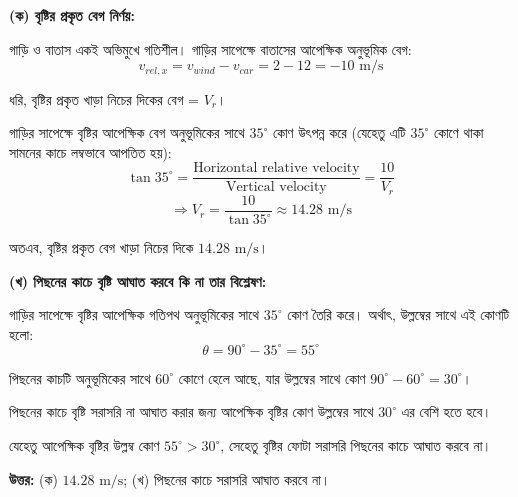 \documentclass[11pt,a4paper]{article}
\begin{document}
\begin{solbox}
\begin{center}
\end{center}

\textbf{(ক) বৃষ্টির প্রকৃত বেগ নির্ণয়:}

গাড়ি ও বাতাস একই অভিমুখে গতিশীল। গাড়ির সাপেক্ষে বাতাসের আপেক্ষিক অনুভূমিক বেগ:
$$v_{rel, x} = v_{wind} - v_{car} = 2 - 12 = -10\text{ m/s}$$

ধরি, বৃষ্টির প্রকৃত খাড়া নিচের দিকের বেগ = $V_r$।

গাড়ির সাপেক্ষে বৃষ্টির আপেক্ষিক বেগ অনুভূমিকের সাথে $35^\circ$ কোণ উৎপন্ন করে (যেহেতু এটি $35^\circ$ কোণে থাকা সামনের কাচে লম্বভাবে আপতিত হয়):
$$\tan 35^\circ = \frac{\text{Horizontal relative velocity}}{\text{Vertical velocity}} = \frac{10}{V_r}$$
$$\Rightarrow V_r = \frac{10}{\tan 35^\circ} \approx 14.28\text{ m/s}$$

অতএব, বৃষ্টির প্রকৃত বেগ খাড়া নিচের দিকে $14.28\text{ m/s}$।

\textbf{(খ) পিছনের কাচে বৃষ্টি আঘাত করবে কি না তার বিশ্লেষণ:}

গাড়ির সাপেক্ষে বৃষ্টির আপেক্ষিক গতিপথ অনুভূমিকের সাথে $35^\circ$ কোণ তৈরি করে। অর্থাৎ, উল্লম্বের সাথে এই কোণটি হলো:
$$\theta = 90^\circ - 35^\circ = 55^\circ$$

পিছনের কাচটি অনুভূমিকের সাথে $60^\circ$ কোণে হেলে আছে, যার উল্লম্বের সাথে কোণ $90^\circ - 60^\circ = 30^\circ$।

পিছনের কাচে বৃষ্টি সরাসরি না আঘাত করার জন্য আপেক্ষিক বৃষ্টির কোণ উল্লম্বের সাথে $30^\circ$ এর বেশি হতে হবে।

যেহেতু আপেক্ষিক বৃষ্টির উল্লম্ব কোণ $55^\circ > 30^\circ$, সেহেতু বৃষ্টির ফোটা সরাসরি পিছনের কাচে আঘাত করবে না।

\textbf{উত্তর:} (ক) $14.28\text{ m/s}$; (খ) পিছনের কাচে সরাসরি আঘাত করবে না।
\end{solbox}
\end{document}
